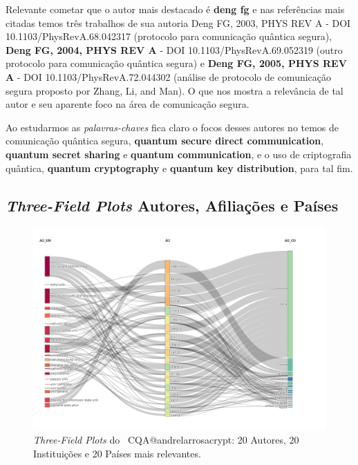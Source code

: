 Relevante cometar que o autor mais destacado é \textbf{deng fg} e nas referências mais citadas temos três trabalhos de sua autoria \textbf{}{Deng FG, 2003, PHYS REV A} - DOI 10.1103/PhysRevA.68.042317 (protocolo para comunicação quântica segura), \textbf{Deng FG, 2004, PHYS REV A} - DOI 10.1103/PhysRevA.69.052319 (outro protocolo para comunicação quântica segura) e \textbf{Deng FG, 2005, PHYS REV A} - DOI 10.1103/PhysRevA.72.044302 (análise de protocolo de comunicação segura proposto por Zhang, Li, and Man). O que nos mostra a relevância de tal autor e seu aparente foco na área de comunicação segura.

Ao estudarmos as \textit{palavras-chaves} fica claro o focos desses autores no temos de comunicação quântica segura, \textbf{quantum secure direct communication}, \textbf{quantum secret sharing} e \textbf{quantum communication}, e o uso de criptografia quântica, \textbf{quantum cryptography} e \textbf{quantum key distribution}, para tal fim.


\subsection{\textit{Three-Field Plots} Autores, Afiliações e Países}

\begin{figure}
    \centering
    \includegraphics[angle=0,width=1\textwidth]{experiments/andrelarrosacrypt/AnaliseBibliometrica/CriptografiaQuantica/imagens/CQA@andrelarrosacrypt_Aut_Aff_Coun.png}
    \caption{\textit{Three-Field Plots} do \dataset\ CQA@andrelarrosacrypt: 20 Autores, 20 Instituições e 20 Países mais relevantes.}
    \label{CQA@andrelarrosacrypt_Aut_Aff_Coun}
\end{figure}

